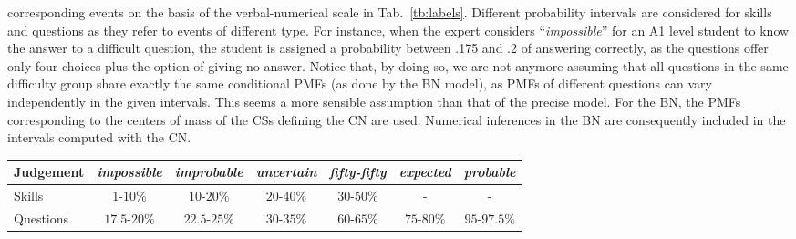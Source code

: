 \documentclass[runningheads]{llncs}
\begin{document}
	corresponding events on the basis of the verbal-numerical scale in Tab.~\ref{tb:labels}. 
	Different probability intervals are considered for skills and questions as they refer to 
	events of different type. For instance, when the expert considers ``\emph{impossible}'' 
	for an A1 level student to know the answer to a difficult question, the student is 
	assigned a probability between .175 and .2 of answering correctly, as the questions 
	offer only four choices plus the option of giving no answer. 
	Notice that, by doing so, we are not anymore assuming that all questions in the same 
	difficulty group share exactly the same conditional PMFs (as done by the BN model), as 
	PMFs of different questions can vary independently in the given intervals. This seems a 
	more sensible assumption than that of the precise model.
	For the BN, the PMFs corresponding to the centers of mass of the CSs defining the CN 
	are used. Numerical inferences in the BN are consequently included in the intervals 
	computed with the CN.
	
	{\small
		\begin{table*}[htp!] 
			\renewcommand{\arraystretch}{1.2}
			\centering
			\begin{tabular}{@{}lcccccc@{}}
				\toprule
				Judgement&\emph{impossible}&\emph{improbable}&\emph{uncertain}&\emph{fifty-fifty}&\emph{expected}&\emph{probable}\\
				\midrule
				Skills&$1$-$10\%$&$10$-$20\%$&$20$-$40\%$&$30$-$50\%$&-&-\\
				Questions&$17.5$-$20\%$&$22.5$-$25\%$&$30$-$35\%$&$60$-$65\%$&$75$-$80\%$&
				 $95$-$97.5\%$\\
				\bottomrule
			\end{tabular}
			\caption{A verbal-numerical scale for probability-intervals 
			elicitation.}\label{tb:labels}
	\end{table*}}
	
\end{document}
